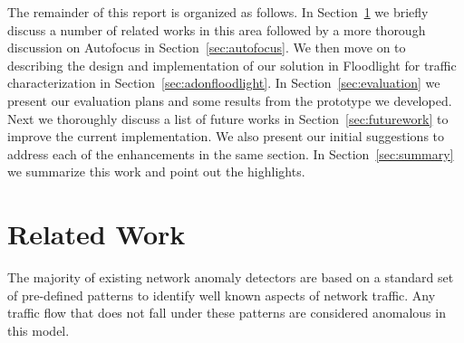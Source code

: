 \documentclass[twocolumn]{article}
\begin{document}
The remainder of this report is organized as follows. In Section~\ref{sec:relatedwork} we briefly discuss a number of related works in this  area followed by a more thorough discussion on Autofocus in Section~\ref{sec:autofocus}. We then move on to describing the design and implementation of our solution in Floodlight for traffic characterization in Section~\ref{sec:adonfloodlight}. In Section~\ref{sec:evaluation} we present our evaluation plans and some results from the prototype we developed. Next we thoroughly discuss a list of future works in Section~\ref{sec:futurework} to improve the current implementation. We also present our initial suggestions to address each of the enhancements in the same section. In Section~\ref{sec:summary} we summarize this work and point out the highlights. 


\section{Related Work}
\label{sec:relatedwork}
The majority of existing network anomaly detectors are based on a standard set of pre-defined patterns to identify well known aspects of network traffic. Any traffic flow that does not fall under these patterns are considered anomalous in this model. 
\end{document}
